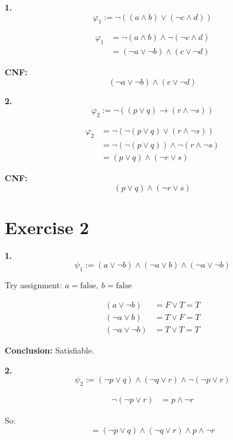 \documentclass{article}
\theoremstyle{theorem}
\theoremstyle{definition}
\theoremstyle{remark}
\begin{document}
\textbf{1.} 
\[
\varphi_1 := \neg((a \land b) \lor (\neg c \land d))
\]

\begin{align*}
\varphi_1 
&= \neg(a \land b) \land \neg(\neg c \land d) \\
&= (\neg a \lor \neg b) \land (c \lor \neg d)
\end{align*}

\textbf{CNF:}
\[
(\neg a \lor \neg b) \land (c \lor \neg d)
\]

\vspace{1em}

\textbf{2.}
\[
\varphi_2 := \neg((p \lor q) \rightarrow (r \land \neg s))
\]

\begin{align*}
\varphi_2 
&= \neg(\neg(p \lor q) \lor (r \land \neg s)) \\
&= \neg(\neg(p \lor q)) \land \neg(r \land \neg s) \\
&= (p \lor q) \land (\neg r \lor s)
\end{align*}

\textbf{CNF:}
\[
(p \lor q) \land (\neg r \lor s)
\]

\newpage

\section*{Exercise 2}

\textbf{1.}
\[
\psi_1 := (a \lor \neg b) \land (\neg a \lor b) \land (\neg a \lor \neg b)
\]

Try assignment: $a = \text{false},\ b = \text{false}$

\begin{align*}
(a \lor \neg b) &= F \lor T = T \\
(\neg a \lor b) &= T \lor F = T \\
(\neg a \lor \neg b) &= T \lor T = T
\end{align*}

\textbf{Conclusion:} Satisfiable.

\vspace{1em}

\textbf{2.}
\[
\psi_2 := (\neg p \lor q) \land (\neg q \lor r) \land \neg (\neg p \lor r)
\]

\begin{align*}
\neg(\neg p \lor r) &= p \land \neg r
\end{align*}

So:
\[
= (\neg p \lor q) \land (\neg q \lor r) \land p \land \neg r
\]
\end{document}
